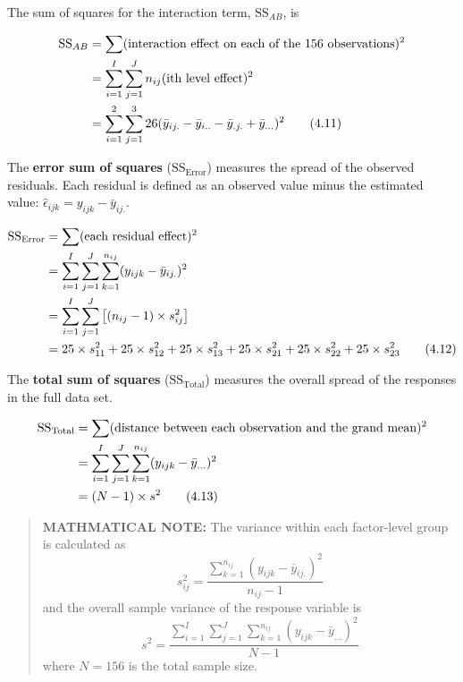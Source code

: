 \documentclass[
]{book}
\begin{document}
The sum of squares for the interaction term, \(\text{SS}_{AB}\), is

\begin{align}\label{4.11}
\text{SS}_{AB} &= \sum (\text{interaction effect on each of the 156 observations})^2 \notag \\
&= \sum_{i=1}^{I} \sum_{j=1}^{J} n_{ij} (\text{ith level effect})^2 \notag \\
&= \sum_{i=1}^{2} \sum_{j=1}^{3} 26 (\bar{y}_{ij.} - \bar{y}_{i..} - \bar{y}_{.j.} + \bar{y}_{...})^2
\tag{4.11}
\end{align}

The \textbf{error sum of squares} (\(\text{SS}_{\text{Error}}\)) measures the spread of the observed residuals. Each residual is defined as an observed value minus the estimated value: \(\hat{\epsilon}_{ijk} = y_{ijk} - \bar{y}_{ij.}\).

\begin{align}\label{4.12}
\text{SS}_{\text{Error}} &= \sum (\text{each residual effect})^2 \notag \\
&= \sum_{i=1}^{I} \sum_{j=1}^{J} \sum_{k=1}^{n_{ij}} (y_{ijk} - \bar{y}_{ij.})^2 \notag \\
&= \sum_{i=1}^{I} \sum_{j=1}^{J} \left[(n_{ij} - 1) \times s_{ij}^2 \right] \notag \\
&= 25 \times s_{11}^2 + 25 \times s_{12}^2 + 25 \times s_{13}^2 + 25 \times s_{21}^2 + 25 \times s_{22}^2 + 25 \times s_{23}^2
\tag{4.12}
\end{align}

The \textbf{total sum of squares} (\(\text{SS}_{\text{Total}}\)) measures the overall spread of the responses in the full data set.

\begin{align}\label{4.13}
\text{SS}_{\text{Total}} &= \sum (\text{distance between each observation and the grand mean})^2 \notag \\
&= \sum_{i=1}^{I} \sum_{j=1}^{J} \sum_{k=1}^{n_{ij}} (y_{ijk} - \bar{y}_{...})^2 \notag \\
&= (N-1) \times s^2
\tag{4.13}
\end{align}

\begin{quote}
\textbf{MATHMATICAL NOTE:}
The variance within each factor-level group is calculated as
\[
s_{ij}^2 = \frac{\sum_{k=1}^{n_{ij}} (y_{ijk} - \bar{y}_{ij.})^2}{n_{ij} - 1}
\]
and the overall sample variance of the response variable is
\[
s^2 = \frac{\sum_{i=1}^{I} \sum_{j=1}^{J} \sum_{k=1}^{n_{ij}} (y_{ijk} - \bar{y}_{...})^2}{N-1}
\]
where \(N = 156\) is the total sample size.
\end{quote}
\end{document}
